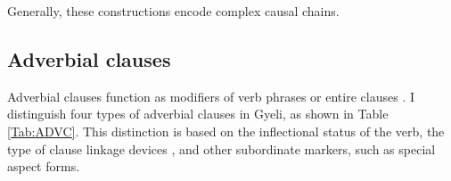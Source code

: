 Generally, these constructions encode complex causal chains.











\subsection{Adverbial clauses}
\label{sec:ADVC}

Adverbial clauses function as modifiers of verb phrases or entire clauses \citep{thompson2007}.
I distinguish four types of adverbial clauses in Gyeli, as shown in Table \ref{Tab:ADVC}. This distinction is based on the inflectional status of the verb, the type of clause linkage devices \citep{hetterle2015}, and other subordinate markers, such as special aspect forms.  

\begin{table}[!h]
\centering
{}
\caption{Adverbial clause types}
\label{Tab:ADVC}
\end{table}


